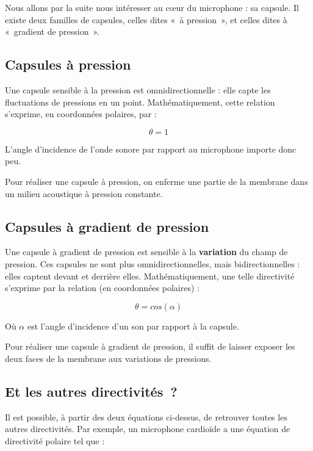 \documentclass[
]{book}
\begin{document}
Nous allons par la suite nous intéresser au cœur du microphone : sa capsule. Il existe deux familles de capsules, celles dites «~à pression~», et celles dites à «~gradient de pression~».

\hypertarget{capsules-uxe0-pression}{%
\subsection{Capsules à pression}\label{capsules-uxe0-pression}}

Une capsule sensible à la pression est omnidirectionnelle : elle capte les fluctuations de pressions en un point. Mathématiquement, cette relation s'exprime, en coordonnées polaires, par :

\[ \theta = 1 \]

L'angle d'incidence de l'onde sonore par rapport au microphone importe donc peu.

Pour réaliser une capsule à pression, on enferme une partie de la membrane dans un milieu acoustique à pression constante.

\hypertarget{capsules-uxe0-gradient-de-pression}{%
\subsection{Capsules à gradient de pression}\label{capsules-uxe0-gradient-de-pression}}

Une capsule à gradient de pression est sensible à la \textbf{variation} du champ de pression. Ces capsules ne sont plus omnidirectionnelles, mais bidirectionnelles : elles captent devant et derrière elles. Mathématiquement, une telle directivité s'exprime par la relation (en coordonnées polaires) :

\[ \theta = cos(\alpha) \]

Où \(\alpha\) est l'angle d'incidence d'un son par rapport à la capsule.

Pour réaliser une capsule à gradient de pression, il suffit de laisser exposer les deux faces de la membrane aux variations de pressions.

\hypertarget{et-les-autres-directivituxe9s}{%
\subsection{Et les autres directivités~?}\label{et-les-autres-directivituxe9s}}

Il est possible, à partir des deux équations ci-dessus, de retrouver toutes les autres directivités. Par exemple, un microphone cardioïde a une équation de directivité polaire tel que :
\end{document}
